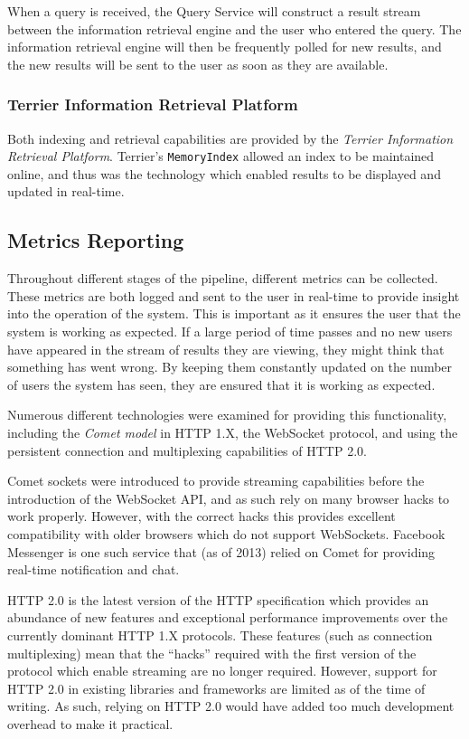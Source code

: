\documentclass{l4proj}
\newcommand{\code}[1]{\texttt{#1}}
\begin{document}
        When a query is received, the Query Service will construct a result stream between the information retrieval engine and the user who entered the query. The information retrieval engine will then be frequently polled for new results, and the new results will be sent to the user as soon as they are available.
        
            \subsubsection{Terrier Information Retrieval Platform}
            Both indexing and retrieval capabilities are provided by the \textit{Terrier Information Retrieval Platform}. Terrier's \code{MemoryIndex} allowed an index to be maintained online, and thus was the technology which enabled results to be displayed and updated in real-time.
       
        \subsection{Metrics Reporting}
        Throughout different stages of the pipeline, different metrics can be collected. These metrics are both logged and sent to the user in real-time to provide insight into the operation of the system. This is important as it ensures the user that the system is working as expected. If a large period of time passes and no new users have appeared in the stream of results they are viewing, they might think that something has went wrong. By keeping them constantly updated on the number of users the system has seen, they are ensured that it is working as expected.
        
        Numerous different technologies were examined for providing this functionality, including the \textit{Comet model} in HTTP 1.X, the WebSocket protocol, and using the persistent connection and multiplexing capabilities of HTTP 2.0.
        
        Comet sockets were introduced to provide streaming capabilities before the introduction of the WebSocket API, and as such rely on many browser hacks to work properly. However, with the correct hacks this provides excellent compatibility with older browsers which do not support WebSockets. Facebook Messenger is one such service that (as of 2013) relied on Comet for providing real-time notification and chat.
        
        HTTP 2.0 is the latest version of the HTTP specification which provides an abundance of new features and exceptional performance improvements over the currently dominant HTTP 1.X protocols. These features (such as connection multiplexing) mean that the ``hacks'' required with the first version of the protocol which enable streaming are no longer required. However, support for HTTP 2.0 in existing libraries and frameworks are limited as of the time of writing. As such, relying on HTTP 2.0 would have added too much development overhead to make it practical.
        
\end{document}

